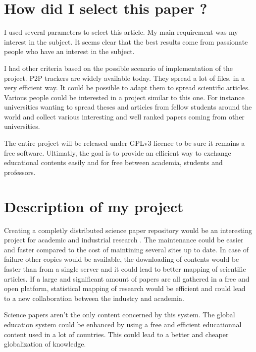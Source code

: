 \documentclass[11pt, a4paper]{article}
\begin{document}

\section{How did I select this paper ?}

I used several parameters to select this article. My main requirement was
my interest in the subject. It seems clear that the best results come
from passionate people who have an interest in the subject.

I had other criteria based on the possible scenario of implementation of
the project. P2P trackers are widely available today. They spread  a lot of files, 
in a very efficient way. It could be possible to adapt them to
spread scientific articles. Various people could be interested in a project similar
to this one. For instance universities wanting to spread theses and articles from
fellow students around the world and collect various interesting and well ranked papers
coming from other universities.

The entire project will be released under GPLv3 licence to be sure it 
remains a free software. Ultimatly, the goal is to provide an efficient way to exchange 
educational contents easily and for free between academia, students and professors.

\section{Description of my project}

Creating a completly distributed science paper repository would be an interesting project 
for academic and industrial research \cite{overcite}. The maintenance could be easier and faster
compared to the cost of maintining several sites up to date. In case of
failure other copies would be available, the downloading of contents would be faster than from
a single server and it could lead to better mapping of scientific articles. If a large and significant
amount of papers are all gathered in a free and open platform, statistical mapping of research would
be efficient and could lead to a new collaboration between the industry and academia.

Science papers aren't the only content concerned by this system. The global education
system could be enhanced by using a free and efficient educationnal content used
in a lot of countries. This could lead to a better and cheaper globalization of knowledge.


\end{document}
